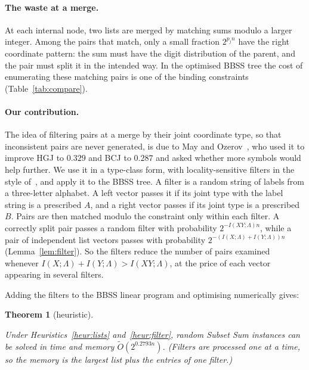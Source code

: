 \documentclass[11pt]{article}
\newtheorem{theorem}{Theorem}
\theoremstyle{definition}
\theoremstyle{remark}
\newcommand{\Ot}{\widetilde{O}}
\newcommand{\status}[1]{}   %
\begin{document}
\paragraph{The waste at a merge.} At each internal node, two lists are merged by matching sums modulo a larger
integer. Among the pairs that match, only a small fraction $2^{p_jn}$ have the right coordinate pattern: the sum
must have the digit distribution of the parent, and the pair must split it in the intended way. In the optimised
BBSS tree the cost of enumerating these matching pairs is one of the binding constraints
(Table~\ref{tab:compare}).

\paragraph{Our contribution.} The idea of filtering pairs at a merge by their joint coordinate type, so that
inconsistent pairs are never generated, is due to May and Ozerov~\cite{Oze16}, who used it to improve HGJ to $0.329$
and BCJ to $0.287$ and asked whether more symbols would help further. We use it in a type-class form, with
locality-sensitive filters in the style of~\cite{BDGL16,Chr17,MO15}, and apply it to the BBSS tree. A filter is a random string of labels from a
three-letter alphabet. A left vector passes it if its joint type with the label string is a prescribed $A$, and a
right vector passes if its joint type is a prescribed $B$. Pairs are then matched modulo the constraint only within
each filter. A correctly split pair passes a random filter with probability $2^{-I(XY;\Lambda)n}$, while a pair of
independent list vectors passes with probability $2^{-(I(X;\Lambda)+I(Y;\Lambda))n}$
(Lemma~\ref{lem:filter}). So the filters reduce the number of pairs examined whenever
$I(X;\Lambda)+I(Y;\Lambda)>I(XY;\Lambda)$, at the price of each vector appearing in several filters.

Adding the filters to the BBSS linear program and optimising numerically gives:

\begin{theorem}[heuristic]\label{thm:main}
\status{numerical optimum of a heuristic model; filter lookup cost still to be argued (Section~\ref{sec:open})}
Under Heuristics~\ref{heur:lists} and~\ref{heur:filter}, random Subset Sum instances can be solved in time and
memory $\Ot(2^{0.2793n})$. (Filters are processed one at a time, so the memory is the largest list plus the entries
of one filter.)
\end{theorem}
\end{document}
